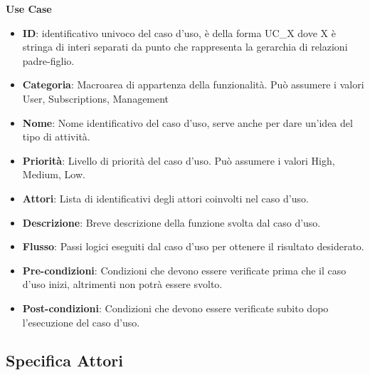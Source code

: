 \noindent \large{\textbf{Use Case}} \\
\begin{itemize}[]
	\item \textbf{ID}: identificativo univoco del caso d'uso, è della forma UC\_X dove X è stringa di interi separati da punto che rappresenta la gerarchia di relazioni padre-figlio.
	\item \textbf{Categoria}: Macroarea di appartenza della funzionalità. Può assumere i valori {User, Subscriptions, Management}
	\item \textbf{Nome}: Nome identificativo del caso d'uso, serve anche per dare un'idea del tipo di attività.
	\item \textbf{Priorità}: Livello di priorità del caso d'uso. Può assumere i valori {High, Medium, Low}. 
	\item \textbf{Attori}: Lista di identificativi degli attori coinvolti nel caso d'uso.
	\item \textbf{Descrizione}: Breve descrizione della funzione svolta dal caso d'uso.
	\item \textbf{Flusso}: Passi logici eseguiti dal caso d'uso per ottenere il risultato desiderato.
	\item \textbf{Pre-condizioni}: Condizioni che devono essere verificate prima che il caso d'uso inizi, altrimenti non potrà essere svolto.
	\item \textbf{Post-condizioni}: Condizioni che devono essere verificate subito dopo l'esecuzione del caso d'uso.

\end{itemize}


\subsection{Specifica Attori}

